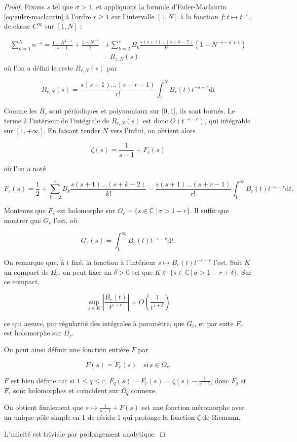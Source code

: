 \documentclass[french]{report}
\begin{document}
\begin{proof}
Fixons $s$ tel que $\sigma>1$, et appliquons la formule d'Euler-Maclaurin \ref{eq:euler-maclaurin} à l'ordre $r\geq1$ sur l'intervalle $[1,N]$ à la fonction $f:t\mapsto t^{-s}$, de classe $C^\infty$ sur $[1,N]$ :

\begin{align*}
  \sum_{n=1}^N n^{-s} = \frac{1-N^{1-s}}{s-1} + \frac{1+N^{-s}}{2} &+ \sum_{k=2}^r B_k\frac{s(s+1)...(s+k-2)}{k!}(1-N^{-s-k+1}) \\
  &- R_{r,N}(s)
\end{align*}
où l'on a défini le reste $ R_{r,N}(s)$ par

\[  R_{r,N}(s) = \frac{s(s+1)...(s+r-1)}{r!}\int_1^N B_r(t)t^{-s-r}\mathrm{d}t \]

Comme les $B_r$ sont périodiques et polynomiaux sur $[0,1[$, ils sont bornés. Le terme à l'intérieur de l'intégrale de $R_{r,N}(s)$ est donc $O(t^{-s-r})$, qui intégrable sur $[1, +\infty]$. En faisant tender $N$ vers l'infini, on obtient alors

\[ \zeta(s) = \frac{1}{s-1} + F_r(s) \]

où l'on a noté

\[ F_r(s) = \frac{1}{2} + \sum_{k=2}^r B_k\frac{s(s+1)...(s+k-2)}{k!} - \frac{s(s+1)...(s+r-1)}{r!}\int_1^\infty B_r(t)t^{-s-r}\mathrm{d}t. \]

Montrons que $F_r$ est holomorphe sur $\Omega_r=\{ s\in\mathbb{C}\,|\,\sigma > 1-r\}$. Il suffit que montrer que $G_r$ l'est, où

\[ G_r(s) = \int_1^\infty B_r(t)t^{-s-r}\mathrm{d}t.\]

On remarque que, à $t$ fixé, la fonction à l'intérieur $s\mapsto B_r(t)t^{-s-r}$ l'est. Soit $K$ un compact de $\Omega_r$, on peut fixer un $\delta>0$ tel que $K\subset\{ s\in\mathbb{C}\,|\,\sigma > 1-r+\delta\}$. Sur ce compact,

\[ \sup_{s\in K}\left|\frac{B_r(t)}{t^{s+r}}\right| = O\left(\frac{1}{t^{1+\delta}}\right) \]

ce qui assure, par régularité des intégrales à paramètre, que $G_r$, et par suite $F_r$ est holomorphe sur $\Omega_r$.

On peut ainsi définir une fonction entière $F$ par

\[ F(s) = F_r(s) \quad\text{si}\,s\in\Omega_r. \]

$F$ est bien définie car si $1\leq q\leq r$, $F_q(s)=F_r(s)=\zeta(s)-\frac{1}{s-1}$, donc $F_q$ et $F_r$ sont holomorphes et coincident sur $\Omega_q$ connexe.

On obtient finalement que $s\mapsto\frac{1}{s-1}+F(s)$ est une fonction méromorphe avec un unique pôle simple en 1 de résidu 1 qui prolonge la fonction $\zeta$ de Riemann.

L'unicité est triviale par prolongement analytique.
\end{proof}
\end{document}
